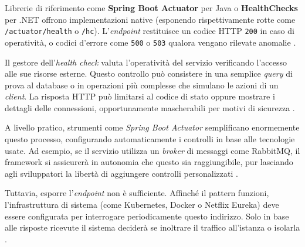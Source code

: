 Librerie di riferimento come \textbf{Spring Boot Actuator} per Java o \textbf{HealthChecks} per .NET offrono implementazioni native (esponendo rispettivamente rotte come \texttt{/actuator/health} o \texttt{/hc}). L'\textit{endpoint} restituisce un codice HTTP \texttt{200} in caso di operatività, o codici d'errore come \texttt{500} o \texttt{503} qualora vengano rilevate anomalie \cite{Richardson2018}.

Il gestore dell'\textit{health check} valuta l'operatività del servizio verificando l'accesso alle sue risorse esterne. Questo controllo può consistere in una semplice \textit{query} di prova al database o in operazioni più complesse che simulano le azioni di un \textit{client}. La risposta HTTP può limitarsi al codice di stato oppure mostrare i dettagli delle connessioni, opportunamente mascherabili per motivi di sicurezza \cite{Richardson2018}.

A livello pratico, strumenti come \textit{Spring Boot Actuator} semplificano enormemente questo processo, configurando automaticamente i controlli in base alle tecnologie usate. Ad esempio, se il servizio utilizza un \textit{broker} di messaggi come RabbitMQ, il framework si assicurerà in autonomia che questo sia raggiungibile, pur lasciando agli sviluppatori la libertà di aggiungere controlli personalizzati \cite{Richardson2018}.

Tuttavia, esporre l'\textit{endpoint} non è sufficiente. Affinché il pattern funzioni, l'infrastruttura di sistema (come Kubernetes, Docker o Netflix Eureka) deve essere configurata per interrogare periodicamente questo indirizzo. Solo in base alle risposte ricevute il sistema deciderà se inoltrare il traffico all'istanza o isolarla \cite{Richardson2018}.



